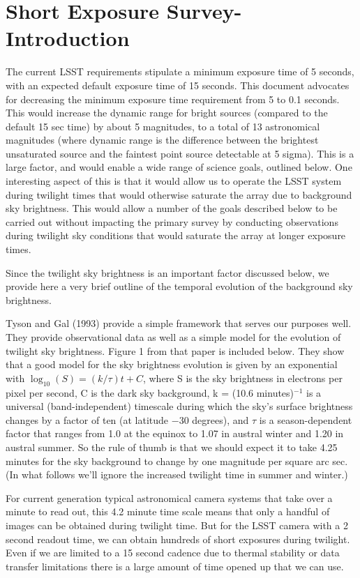 
\section{Short Exposure Survey- Introduction }

The current LSST requirements stipulate a minimum exposure time of 5 seconds, with an expected default exposure time of 15 seconds. This document advocates for decreasing the minimum exposure time requirement from 5 to 0.1 seconds. This would increase the dynamic range for bright sources (compared to the default 15 sec time) by about 5 magnitudes, to a total of 13 astronomical magnitudes (where dynamic range is the difference between the brightest unsaturated source and the faintest point source detectable at 5 sigma). This is a large factor, and would enable a wide range of science goals, outlined below. One interesting aspect of this is that it would allow us to operate the LSST system during twilight times that would otherwise saturate the array due to background sky brightness. This would allow a number of the goals described below to be carried out without impacting the primary survey by conducting observations during twilight sky conditions that would saturate the array at longer exposure times. 

Since the twilight sky brightness is an important factor discussed below, we provide here a very brief outline of the temporal evolution of the background sky brightness. 

Tyson and Gal (1993) provide a simple framework that serves our purposes well. They provide observational data as well as a simple model for the evolution of twilight sky brightness. Figure 1 from that paper is included below. They show that a good model for the sky brightness evolution is given by an exponential with 
$\log_{10}(S)=(k/\tau)t+C$, 
where S is the sky brightness in electrons per pixel per second, C is the dark sky background, k = (10.6 minutes)$^{-1}$  is a universal (band-independent) timescale during which the sky's surface brightness changes by a factor of ten (at latitude $-$30 degrees), and $\tau$ is a season-dependent factor that ranges from 1.0 at the equinox to 1.07 in austral winter and 1.20 in austral summer. So the rule of thumb is that we should expect it to take 4.25 minutes for the sky background to change by one magnitude per square arc sec. (In what follows we'll ignore the increased twilight time in summer and winter.)

For current generation typical astronomical camera systems that take over a minute to read out, this 4.2 minute time scale means that only a handful of images can be obtained during twilight time. But for the LSST camera with a 2 second readout time, we can obtain hundreds of short exposures during twilight. Even if we are limited to a 15 second cadence due to thermal stability or data transfer limitations there is a large amount of time opened up that we can use. 

